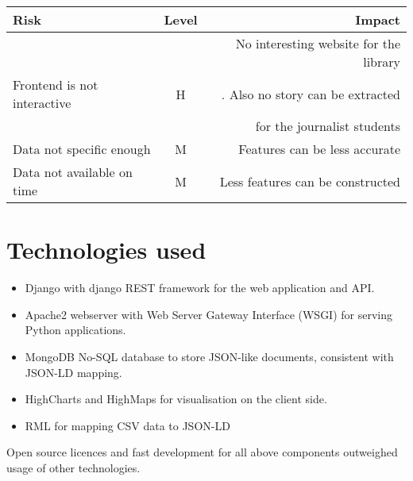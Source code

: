 \begin{center}
  \begin{tabular}{ l | c | r  }
    \hline
    Risk & Level & Impact \\ \hline
   & & No interesting website for the library\\
      Frontend is not interactive & H & . Also no story can be extracted\\
    & &  for the journalist students \\
    Data not specific enough & M & Features can be less accurate \\
    Data not available on time & M & Less features can be constructed\\
  \end{tabular}
\end{center}

\section{Technologies used}

\begin{itemize}
	\item Django with django REST framework for the web application and API.
	\item Apache2 webserver with Web Server Gateway Interface (WSGI) for serving Python applications.
	\item MongoDB No-SQL database to store JSON-like documents, consistent with JSON-LD mapping.
  \item HighCharts and HighMaps for visualisation on the client side.
  \item RML for mapping CSV data to JSON-LD
\end{itemize}

Open source licences and fast development for all above components outweighed usage of other technologies.

